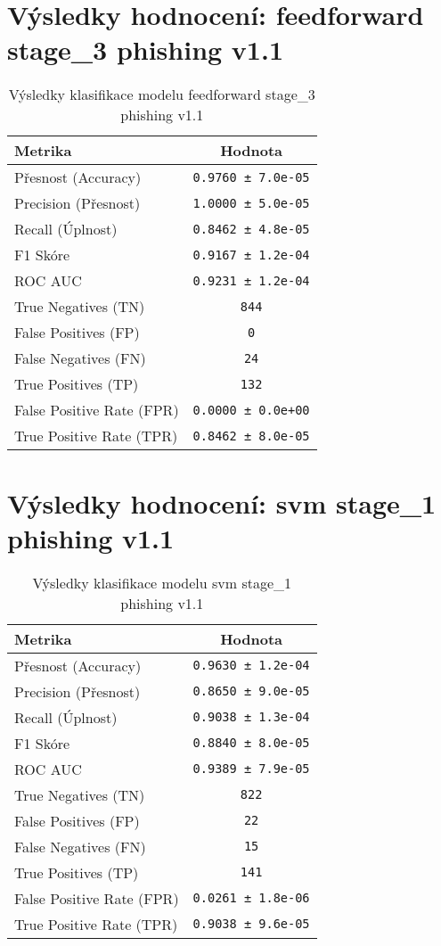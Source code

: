 \section*{Výsledky hodnocení: feedforward stage_3 phishing v1.1}
\begin{table}[h!]
\centering
\begin{tabular}{|l|c|}
\hline
\textbf{Metrika} & \textbf{Hodnota} \\
\hline
Přesnost (Accuracy) & \texttt{0.9760 ± 7.0e-05} \\
Precision (Přesnost) & \texttt{1.0000 ± 5.0e-05} \\
Recall (Úplnost) & \texttt{0.8462 ± 4.8e-05} \\
F1 Skóre & \texttt{0.9167 ± 1.2e-04} \\
ROC AUC & \texttt{0.9231 ± 1.2e-04} \\
True Negatives (TN) & \texttt{844} \\
False Positives (FP) & \texttt{0} \\
False Negatives (FN) & \texttt{24} \\
True Positives (TP) & \texttt{132} \\
False Positive Rate (FPR) & \texttt{0.0000 ± 0.0e+00} \\
True Positive Rate (TPR) & \texttt{0.8462 ± 8.0e-05} \\
\hline
\end{tabular}
\caption{Výsledky klasifikace modelu feedforward stage_3 phishing v1.1}
\label{tab:phishing_feedforward}
\end{table}

\section*{Výsledky hodnocení: svm stage_1 phishing v1.1}
\begin{table}[h!]
\centering
\begin{tabular}{|l|c|}
\hline
\textbf{Metrika} & \textbf{Hodnota} \\
\hline
Přesnost (Accuracy) & \texttt{0.9630 ± 1.2e-04} \\
Precision (Přesnost) & \texttt{0.8650 ± 9.0e-05} \\
Recall (Úplnost) & \texttt{0.9038 ± 1.3e-04} \\
F1 Skóre & \texttt{0.8840 ± 8.0e-05} \\
ROC AUC & \texttt{0.9389 ± 7.9e-05} \\
True Negatives (TN) & \texttt{822} \\
False Positives (FP) & \texttt{22} \\
False Negatives (FN) & \texttt{15} \\
True Positives (TP) & \texttt{141} \\
False Positive Rate (FPR) & \texttt{0.0261 ± 1.8e-06} \\
True Positive Rate (TPR) & \texttt{0.9038 ± 9.6e-05} \\
\hline
\end{tabular}
\caption{Výsledky klasifikace modelu svm stage_1 phishing v1.1}
\label{tab:phishing_svm}
\end{table}


